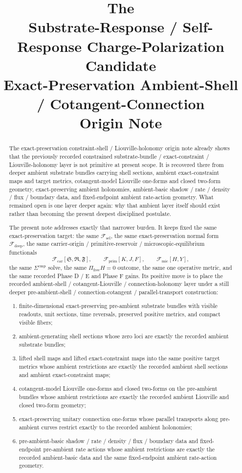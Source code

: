 \documentclass[11pt]{article}
\title{\textbf{The \TheoryName{}}\\[0.4em]
\large Substrate-Response / Self-Response Charge-Polarization Candidate\\
\large Exact-Preservation Ambient-Shell / Cotangent-Connection\\
\large Origin Note}
\author{}
\date{}
\newcommand{\GaugeAux}{Y}
\newcommand{\MicFunctional}{\mathscr F_{\mathrm{mic}}}
\newcommand{\PrimFunctional}{\mathscr F_{\mathrm{prim}}}
\newcommand{\CarrierFunctional}{\mathscr F_{\mathrm{car}}}
\newcommand{\DeepFunctional}{\mathscr F_{\mathrm{deep}}}
\newcommand{\StemFunctional}{\mathscr F_{\mathrm{sel}}}
\newcommand{\PrimStrain}{K}
\newcommand{\PrimNeutral}{J}
\newcommand{\PrimFree}{F}
\newcommand{\CarrierSeed}{\mathfrak S}
\newcommand{\RelabelSeed}{\mathfrak R}
\newcommand{\FreeSeed}{\mathfrak F}
\begin{document}
\maketitle

\begin{abstract}
The exact-preservation constraint-shell / Liouville-holonomy origin note already shows that the previously recorded constrained substrate-bundle / exact-constraint / Liouville-holonomy layer is not primitive at present scope. It is recovered there from deeper ambient substrate bundles carrying shell sections, ambient exact-constraint maps and target metrics, cotangent-model Liouville one-forms and closed two-form geometry, exact-preserving ambient holonomies, ambient-basic shadow / rate / density / flux / boundary data, and fixed-endpoint ambient rate-action geometry. What remained open is one layer deeper again: why that ambient layer itself should exist rather than becoming the present deepest disciplined postulate.

The present note addresses exactly that narrower burden. It keeps fixed the same exact-preservation target: the same \(\StemFunctional\), the same exact-preservation normal form \(\DeepFunctional\), the same carrier-origin / primitive-reservoir / microscopic-equilibrium functionals
\[
\CarrierFunctional[\CarrierSeed,\RelabelSeed,\FreeSeed],\qquad
\PrimFunctional[\PrimStrain,\PrimNeutral,\PrimFree],\qquad
\MicFunctional[H,\GaugeAux],
\]
the same \(\Sigma^{\mathrm{cmp}}\) solve, the same \(\Pi_{\mathrm{free}}H=0\) outcome, the same one operative metric, and the same recorded Phase D / E and Phase F gains. Its positive move is to place the recorded ambient-shell / cotangent-Liouville / connection-holonomy layer under a still deeper pre-ambient-shell / connection-cotangent / parallel-transport construction:
\begin{enumerate}
    \item finite-dimensional exact-preserving pre-ambient substrate bundles with visible readouts, unit sections, time reversals, preserved positive metrics, and compact visible fibers;
    \item ambient-generating shell sections whose zero loci are exactly the recorded ambient substrate bundles;
    \item lifted shell maps and lifted exact-constraint maps into the same positive target metrics whose ambient restrictions are exactly the recorded ambient shell sections and ambient exact-constraint maps;
    \item cotangent-model Liouville one-forms and closed two-forms on the pre-ambient bundles whose ambient restrictions are exactly the recorded ambient Liouville and closed two-form geometry;
    \item exact-preserving unitary connection one-forms whose parallel transports along pre-ambient curves restrict exactly to the recorded ambient holonomies;
    \item pre-ambient-basic shadow / rate / density / flux / boundary data and fixed-endpoint pre-ambient rate actions whose ambient restrictions are exactly the recorded ambient-basic data and the same fixed-endpoint ambient rate-action geometry.
\end{enumerate}


\end{abstract}
\end{document}
